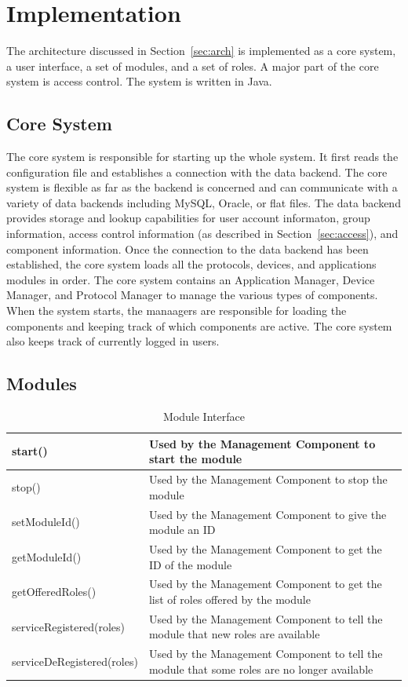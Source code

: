 \section{Implementation}
\label{sec:implementation}
The architecture discussed in Section~\ref{sec:arch} is implemented as a core
system, a user interface, a set of modules, and a set of roles. A major part of
the core system is access control. The system is written in Java.
\subsection{Core System}
\label{sec:core}
The core system is responsible for starting up the whole system. It first reads
the configuration file and establishes a connection with the data backend. The
core system is flexible as far as the backend is concerned and can communicate
with a variety of data backends including MySQL, Oracle, or flat files. The data
backend provides storage and lookup capabilities for user account informaton,
group information, access control information (as described in
Section~\ref{sec:access}), and component information. Once the connection to
the data backend has been established, the core system loads all the protocols,
devices, and applications modules in order. The core system contains an
Application Manager, Device Manager, and Protocol Manager to manage the various
types of components. When the system starts, the manaagers are responsible for
loading the components and keeping track of which components are active. The
core system also keeps track of currently logged in users.
\subsection{Modules}
\label{sec:modules}
\begin{table}
\begin{center}
\begin{tabular}{| p{4cm} | p{3cm} |}
\hline
start() & Used by the Management Component to start the module \\ \hline
stop() & Used by the Management Component to stop the module \\ \hline
setModuleId() & Used by the Management Component to give the module an ID \\ \hline
getModuleId() & Used by the Management Component to get the ID of the module \\ \hline
getOfferedRoles() & Used by the Management Component to get the list of roles
offered by the module \\ \hline
serviceRegistered(roles) & Used by the Management Component to tell
the module that new roles are available \\ \hline
serviceDeRegistered(roles) & Used by the Management Component to tell
the module that some roles are no longer available \\ \hline
\end{tabular}
\end{center}
\caption{Module Interface}
\label{tab:module}
\end{table}

